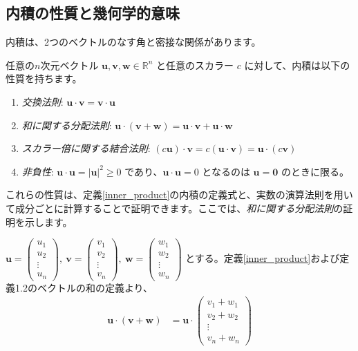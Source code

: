 \subsection{内積の性質と幾何学的意味}

内積は、2つのベクトルのなす角と密接な関係があります。

\begin{thm}[内積の性質] \label{inner_product_property}
任意の$n$次元ベクトル $\bm{u}, \bm{v}, \bm{w} \in \mathbb{R}^n$ と任意のスカラー $c$ に対して、内積は以下の性質を持ちます。
\begin{enumerate}
\item \emph{交換法則}: $\bm{u} \cdot \bm{v} = \bm{v} \cdot \bm{u}$
\item \emph{和に関する分配法則}: $\bm{u} \cdot (\bm{v} + \bm{w}) = \bm{u} \cdot \bm{v} + \bm{u} \cdot \bm{w}$
\item \emph{スカラー倍に関する結合法則}: $(c\bm{u}) \cdot \bm{v} = c(\bm{u} \cdot \bm{v}) = \bm{u} \cdot (c\bm{v})$
\item \emph{非負性}: $\bm{u} \cdot \bm{u} = |\bm{u}|^2 \ge 0$ であり、$\bm{u} \cdot \bm{u} = 0$ となるのは $\bm{u} = \bm{0}$ のときに限る。
\end{enumerate}
\begin{proof*}
これらの性質は、定義\ref{inner_product}の内積の定義式と、実数の演算法則を用いて成分ごとに計算することで証明できます。ここでは、\emph{和に関する分配法則}の証明を示します。\par
$\bm{u} = \begin{pmatrix} u_1 \\ u_2 \\ \vdots \\ u_n \end{pmatrix},\ \bm{v} = \begin{pmatrix} v_1 \\ v_2 \\ \vdots \\ v_n \end{pmatrix},\ \bm{w} = \begin{pmatrix} w_1 \\ w_2 \\ \vdots \\ w_n \end{pmatrix}$ とする。定義\ref{inner_product}および定義1.2のベクトルの和の定義より、
\begin{align*}
\bm{u} \cdot (\bm{v} + \bm{w}) &= \bm{u} \cdot \begin{pmatrix} v_1 + w_1 \\ v_2 + w_2 \\ \vdots \\ v_n + w_n \end{pmatrix} \\

\end{align*}
\end{proof*}
\end{thm}
